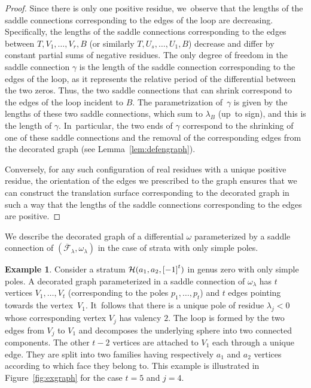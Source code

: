 \documentclass[11pt]{article}
\newcommand\calH{{\mathcal H}}
\theoremstyle{definition}
\newtheorem{ex}[thm]{Example}
\begin{document}
\begin{proof}
Since there is only one positive residue, we~observe that the lengths of the saddle connections corresponding to the edges of the loop are decreasing. Specifically, the lengths of the saddle connections corresponding to the edges between $T,V_{1},\dots,V_{r},B$ (or similarly $T,U_{s},\dots,U_{1},B$) decrease and differ by constant partial sums of negative residues. The only degree of freedom in the saddle connection $\gamma$ is the length of the saddle connection corresponding to the edges of the loop, as it represents the relative period of the differential between the two zeros. Thus, the two saddle connections that can shrink correspond to the edges of the loop incident to $B$. The parametrization of~$\gamma$ is given by the lengths of these two saddle connections, which sum to $\lambda_{B}$ (up~to sign), and this is the length of $\gamma$. In~particular, the two ends of $\gamma$ correspond to the shrinking of one of these saddle connections and the removal of the corresponding edges from the decorated graph (see Lemma~\ref{lem:defengraph}).

Conversely, for any such configuration of real residues with a unique positive residue, the orientation of the edges we prescribed to the graph ensures that we can construct the translation surface corresponding to the decorated graph in such a way that the lengths of the saddle connections corresponding to the edges are positive.
\end{proof}

We describe the decorated graph of a differential $\omega$ parameterized by a saddle connection of $(\overline{\mathcal{F}}_{\lambda}, \omega_\lambda)$ in the case of strata with only simple poles.
\begin{ex}
Consider a stratum $\calH(a_{1},a_{2},\rec[-1][t])$ in genus zero with only simple poles. A decorated graph parameterized in a saddle connection of $\omega_\lambda$
has $t$ vertices $V_{1},\dots,V_{t}$ (corresponding to the poles $p_{1},\dots,p_{t}$) and $t$ edges pointing towards the vertex~$V_{1}$. It~follows that there is a unique pole of residue $\lambda_{j}<0$ whose corresponding vertex $V_{j}$ has valency $2$. The loop is formed by the two edges from $V_{j}$ to $V_{1}$ and decomposes the underlying sphere into two connected components. The other $t-2$ vertices are attached to $V_{1}$ each through a unique edge. They are split into two families having respectively $a_{1}$ and $a_{2}$ vertices according to which face they belong to. This example is illustrated in Figure~\ref{fig:exgraph} for the case $t = 5$ and $j=4$.
\end{ex}
\end{document}
